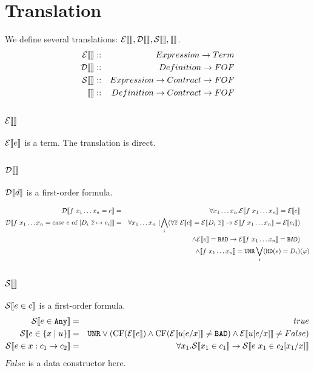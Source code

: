 \documentclass{article}
\begin{document}
\section{Translation}
We define several translations: $\etrans{},\dtrans{},\strans{},\trans{}$.
\begin{eqnarray*}
  \etrans{} &::& Expression \to Term \\
  \dtrans{} &::& Definition \to FOF  \\
  \strans{} &::& Expression \to Contract \to FOF \\
  \trans {} &::& Definition \to Contract \to FOF \\
\end{eqnarray*}

\subsection{$\etrans{}$}
$\etrans{e}$ is a term. The translation is direct.

\subsection{$\dtrans{}$}
$\dtrans{d}$ is a first-order formula.

\begin{eqnarray*}
\dtrans{f~x_1 \dots x_n = e} &=& \forall x_1 \dots x_n.\etrans{f~x_1 \dots x_n} = \etrans{e} & \\
\dtrans{f~x_1 \dots x_n = \mbox{case } e \mbox{ of } [D_i~\overline{z} \mapsto e_i]} &=& \forall x_1 \dots x_n~(\bigwedge_i (\forall \overline{z}~\etrans{e} = \etrans{D_i~\overline{z}} \to \etrans{f~x_1 \dots x_n} = \etrans{e_i}) & \\
&& \land \etrans{e} = \bad \to \etrans{f~x_1 \dots x_n} = \bad)& \\ 
&& \land \trans{f~x_1 \dots x_n} = \unr \bigvee_i (\texttt{HD}(e) = D_i) & (\varphi) \\
\end{eqnarray*}

\subsection{$\strans{}$}
$\strans{e \in c}$ is a first-order formula.
\begin{eqnarray}
\strans{e \in \any} &=& true \\
\strans{e \in \{x \mid u \}} &=& \unr \lor (\mbox{CF}(\etrans{e}) \land \mbox{CF}(\etrans{u[e/x]} \neq \bad) \land \etrans{u[e/x]} \neq False) \\
\strans{e \in x:c_1 \to c_2}  &=& \forall x_1. \strans{x_1 \in c_1} \to \strans{e~x_1 \in c_2[x_1/x]} \\
\end{eqnarray}
$False$ is a data constructor here.
\end{document}
